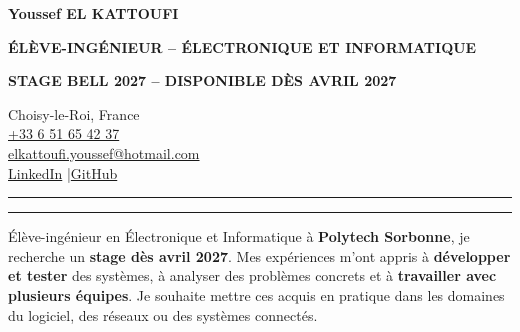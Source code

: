 \documentclass[9pt,a4paper]{extarticle}
\newcommand{\stage}{STAGE BELL 2027 -- DISPONIBLE DÈS AVRIL 2027}
\begin{document}
\begin{minipage}[t]{.635\linewidth}
  {\fontsize{21.2}{22.3}\selectfont\bfseries\color{bleu}Youssef EL KATTOUFI}\par\vspace{1.5pt}
  {\fontsize{10.2}{11.5}\selectfont\bfseries\color{rouge}ÉLÈVE-INGÉNIEUR -- ÉLECTRONIQUE ET INFORMATIQUE}\par\vspace{1.1pt}
  {\fontsize{9.15}{10}\selectfont\bfseries\color{bleu}\stage}\par
\end{minipage}\hfill
\begin{minipage}[t]{.355\linewidth}\raggedleft
  {\fontsize{8.7}{10.2}\selectfont
  Choisy-le-Roi, France\\
  \href{tel:+33651654237}{+33 6 51 65 42 37}\\
  \href{mailto:elkattoufi.youssef@hotmail.com}{elkattoufi.youssef@hotmail.com}\\
  \href{https://www.linkedin.com/in/youssef-el-kattoufi-5a04a0282/}{LinkedIn} \quad\textcolor{gris}{|}\quad \href{https://github.com/Darkzveller}{GitHub} }
\end{minipage}
\vspace{4.1pt}
\textcolor{rouge}{\rule{1.35cm}{1.75pt}}\hspace{1pt}\textcolor{gris!65}{\rule{\dimexpr\linewidth-1.45cm\relax}{.6pt}}\par\vspace{3.0pt}
{\fontsize{9.0}{10.7}\selectfont
Élève-ingénieur en Électronique et Informatique à \textbf{Polytech Sorbonne}, je recherche un \textbf{stage dès avril 2027}. Mes expériences m'ont appris à \textbf{développer et tester} des systèmes, à analyser des problèmes concrets et à \textbf{travailler avec plusieurs équipes}. Je souhaite mettre ces acquis en pratique dans les domaines du logiciel, des réseaux ou des systèmes connectés.\par}
\end{document}
